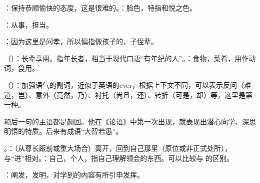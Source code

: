 {
\item {}：保持恭顺愉快的态度，这是很难的。：脸色，特指和悦之色。
\item {}：从事，担当。
\item {}：因为这里是问孝，所以偏指做孩子的，子侄辈。
\item {}（）：长辈享用。指年长者，相当于现代口语“有年纪的人”。：食物，菜肴，用作动词，食用。
\item {}（）：加强语气的副词，近似于英语的ever，根据上下文不同，可以表示反问（难道，岂）、意外（竟然，乃）、衬托（尚且，还）、转折（可是，却）等，这里是第一种。
}
{}


{
\item {}和后一句的主语都是颜回。他在《论语》中第一次出现，就表现出潜心向学、深思明悟的特质。后来有成语“大智若愚”。
\item {}。：（从尊长跟前或重大场合）离开，回到自己那里（原位或非正式处所），与“进”相对。：自己，个人，指自己理解领会的东西。可以比较与  的区别。
\item {}：阐发，发明，对学到的内容有所引申发挥。
}
{}


